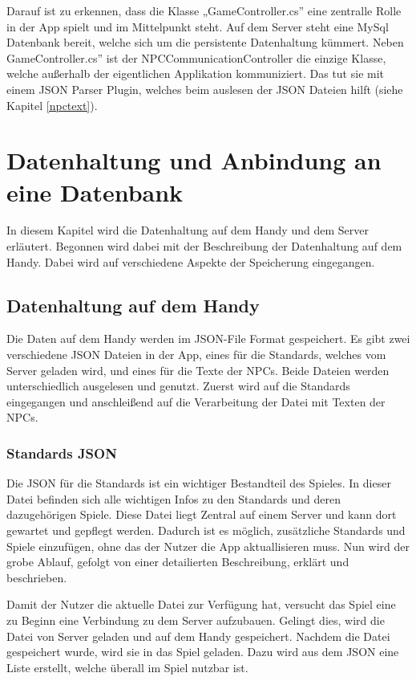 		Darauf ist zu erkennen, dass die Klasse „GameController.cs” eine zentralle Rolle in der App spielt und im Mittelpunkt steht. Auf dem Server steht eine MySql Datenbank bereit, welche sich um die persistente Datenhaltung kümmert. Neben GameController.cs” ist der NPCCommunicationController die einzige Klasse, welche außerhalb der eigentlichen Applikation kommuniziert. Das tut sie mit einem \ac{JSON} Parser Plugin, welches beim auslesen der \ac{JSON} Dateien hilft (siehe Kapitel \ref{npctext}).	

	\section{Datenhaltung und Anbindung an eine Datenbank}
		In diesem Kapitel wird die Datenhaltung auf dem Handy und dem Server erläutert. Begonnen wird dabei mit der Beschreibung der Datenhaltung auf dem Handy. Dabei wird auf verschiedene Aspekte der Speicherung eingegangen.

		\subsection{Datenhaltung auf dem Handy}
			Die Daten auf dem Handy werden im \ac{JSON}-File Format gespeichert. Es gibt zwei verschiedene \ac{JSON} Dateien in der App, eines für die Standards, welches vom Server geladen wird, und eines für die Texte der \acp{NPC}. Beide Dateien werden unterschiedlich ausgelesen und genutzt. Zuerst wird auf die Standards eingegangen und anschleißend auf die Verarbeitung der Datei mit Texten der \acp{NPC}. 

			\subsubsection{Standards \ac{JSON}}
				Die \ac{JSON} für die Standards ist ein wichtiger Bestandteil des Spieles. In dieser Datei befinden sich alle wichtigen Infos zu den Standards und deren dazugehörigen Spiele. Diese Datei liegt Zentral auf einem Server und kann dort gewartet und gepflegt werden. Dadurch ist es möglich, zusätzliche Standards und Spiele einzufügen, ohne das der Nutzer die App aktuallisieren muss. Nun wird der grobe Ablauf, gefolgt von einer detailierten Beschreibung, erklärt und beschrieben.

				Damit der Nutzer die aktuelle Datei zur Verfügung hat, versucht das Spiel eine zu Beginn eine Verbindung zu dem Server aufzubauen. Gelingt dies, wird die Datei von Server geladen und auf dem Handy gespeichert. Nachdem die Datei gespeichert wurde, wird sie in das Spiel geladen. Dazu wird aus dem \ac{JSON} eine Liste erstellt, welche überall im Spiel nutzbar ist.

